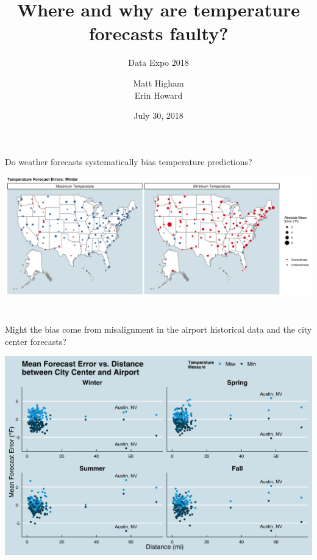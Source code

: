 \documentclass[handout,t]{beamer}
\title[Where and why are temperature forecasts faulty?]{Where and why are temperature forecasts faulty?}
\subtitle{Data Expo 2018}
\date{July 30, 2018}
\author[Matt Higham, Erin Howard]{Matt Higham \\ Erin Howard}
\begin{document}

\frame{\titlepage}
\section{}
\begin{frame}{Do weather forecasts systematically bias temperature predictions?}

  \hspace*{-0.5cm}\includegraphics[width=1.1\textwidth,natwidth=200,natheight=87]{Both_winter_maps_new.png}

\end{frame}



\section{}
\begin{frame}{Might the bias come from misalignment in the airport historical data and the city center forecasts?}
  \begin{center}
  \includegraphics[scale=0.07]{Distance_Plot_Poster_new.png}
  \end{center}
\end{frame}
\end{document}
